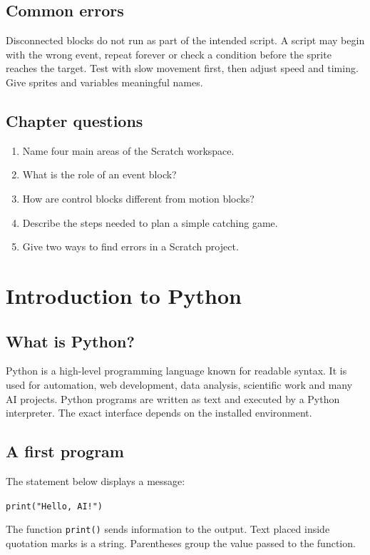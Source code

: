 \documentclass[11pt,openany,oneside]{book}
\begin{document}
\section{Common errors}
Disconnected blocks do not run as part of the intended script. A script may begin with the wrong event, repeat forever or check a condition before the sprite reaches the target. Test with slow movement first, then adjust speed and timing. Give sprites and variables meaningful names.

\section{Chapter questions}
\begin{enumerate}
\item Name four main areas of the Scratch workspace.
\item What is the role of an event block?
\item How are control blocks different from motion blocks?
\item Describe the steps needed to plan a simple catching game.
\item Give two ways to find errors in a Scratch project.
\end{enumerate}

\chapter{Introduction to Python}
\section{What is Python?}
Python is a high-level programming language known for readable syntax. It is used for automation, web development, data analysis, scientific work and many AI projects. Python programs are written as text and executed by a Python interpreter. The exact interface depends on the installed environment.

\section{A first program}
The statement below displays a message:
\begin{tcolorbox}[colback=SoftGray,colframe=Navy,boxrule=.5pt,arc=1mm]
\texttt{print("Hello, AI!")}
\end{tcolorbox}
The function \texttt{print()} sends information to the output. Text placed inside quotation marks is a string. Parentheses group the value passed to the function.
\end{document}
